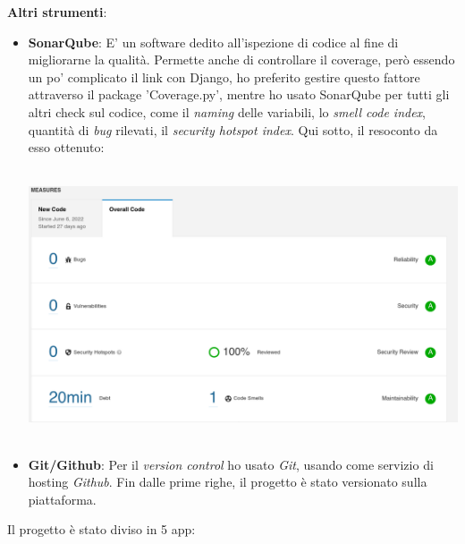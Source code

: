 \documentclass[12pt]{article}
\begin{document}
	\noindent \textbf{Altri strumenti}:
	\begin{itemize}
		\item \textbf{SonarQube}: E' un software dedito all'ispezione di codice al fine di migliorarne la qualità. Permette anche di controllare il coverage, però essendo un po' complicato il link con Django, ho preferito gestire questo fattore attraverso il package 'Coverage.py', mentre ho usato SonarQube per tutti gli altri check sul codice, come il \textit{naming} delle variabili, lo \textit{smell code index}, quantità di \textit{bug} rilevati, il \textit{security hotspot index}. Qui sotto, il resoconto da esso ottenuto:

		\begin{center}
			\includegraphics[width=15cm, height=8cm]{Immagini/sonarqube_report.png} \\
		\end{center}
		
		\item \textbf{Git/Github}: Per il \textit{version control} ho usato \textit{Git}, usando come servizio di hosting \textit{Github}. Fin dalle prime righe, il progetto è stato versionato sulla piattaforma.
	\end{itemize}
	\pagebreak

	
	Il progetto è stato diviso in 5 app:
	
\end{document}
